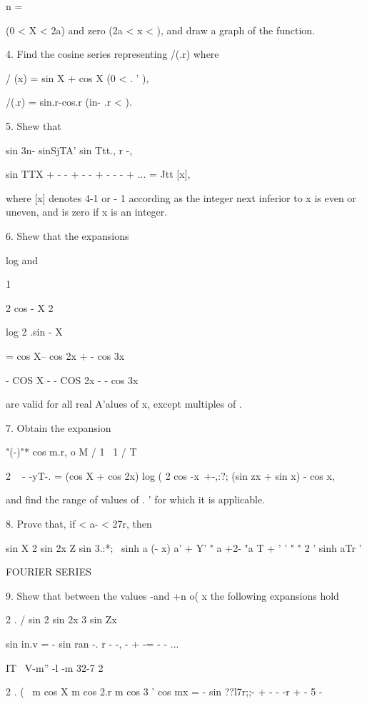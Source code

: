 n = \

(0 < X < 2a) and zero (2a < x < \pi), and draw a graph of the function.


4. Find the cosine series representing /(.r) where

/ (x) = sin X + cos X (0 < . ' \pi ),

/(.r) = sin.r-cos.r (in- .r < \pi). 

5. Shew that

sin 3n- sinSjTA' sin Ttt., r -,

sin TTX + - - + - - + - - - + ... = Jtt [x],

where [x] denotes 4-1 or - 1 according as the integer next inferior to
x is even or uneven, and is zero if x is an integer. 

6. Shew that the expansions

log and

1

2 cos - X 2

log 2 .sin - X

= cos X-- cos 2x + - cos 3x

- COS X - - COS 2x - - cos 3x

are valid for all real A'alues of x, except multiples of \pi.

7. Obtain the expansion

"(-)"* cos m.r, o M / 1 \ 1 /  T  \

2 ~ - -yT-. = (cos X + cos 2x) log ( 2 cos -x\ +-,:?; (sin zx + sin x)
- cos x,

and find the range of values of . ' for which it is applicable.

8. Prove that, if < a- < 27r, then

sin X 2 sin 2x Z sin 3.:*; \ \pi sinh a (\pi - x) a' + Y' " a +2- "a T +
' ' " " 2 ' sinh aTr '


FOURIER SERIES

%
%

9. Shew that between the values -\pi and +n o( x the following
expansions hold

2 . / sin 2 sin 2x 3 sin Zx

sin in.v = - sin ran -. r - -, - + -= - - ...

IT \ V-m'' -l -m 32-7 2

2 . ( \ m cos X m cos 2.r m cos 3 ' cos mx = - sin ??l7r;;- + - - -r
+ - 5 -

